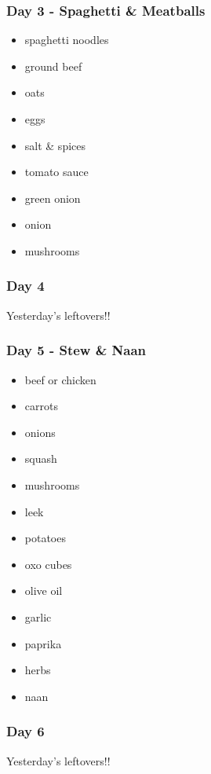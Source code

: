 \documentclass[11pt, a4paper]{article}
\begin{document}
\subsubsection{Day 3 - Spaghetti \& Meatballs}
\vspace{1pc}
\begin{itemize}
\item spaghetti noodles
\item ground beef
\item oats
\item eggs
\item salt \& spices
\item tomato sauce
\item green onion
\item onion
\item mushrooms
\end{itemize}

\subsubsection{Day 4}
\vspace{1pc}
Yesterday's leftovers!!
\vspace{2pc}

\subsubsection{Day 5 - Stew \& Naan}
\vspace{1pc}
\begin{itemize}
\item beef or chicken
\item carrots
\item onions
\item squash
\item mushrooms
\item leek
\item potatoes
\item oxo cubes
\item olive oil
\item garlic
\item paprika
\item herbs
\item naan
\end{itemize}

\subsubsection{Day 6}
\vspace{1pc}
Yesterday's leftovers!!
\vspace{2pc}
\end{document}
